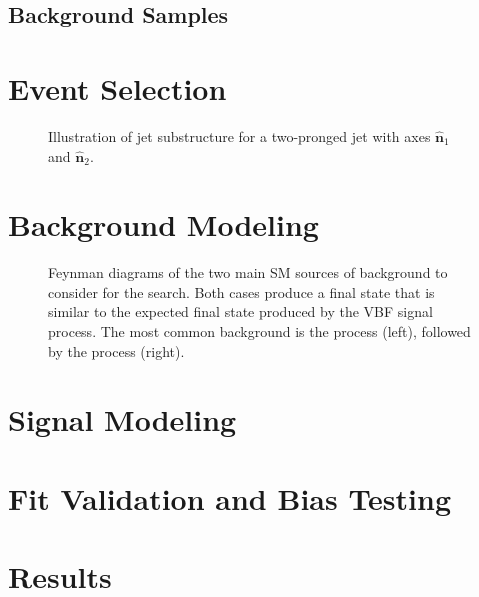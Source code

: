 \begin{table}[htbp]
  \centering
  
  \caption{
  }
  \label{tab:VBFZprToWWSamples}
\end{table}

\subsection{Background Samples}

\section{Event Selection}
\label{sec:events}

\begin{figure}[htbp]
  \centering
  
  \caption{Illustration of jet substructure for a two-pronged jet with axes $\mathbf{\hat{n}}_1$ and $\mathbf{\hat{n}}_2$.}
  \label{fig:jet}
\end{figure}

\section{Background Modeling}
\label{sec:bkg}

\begin{figure}[htbp]
  \centering
  
  \caption{Feynman diagrams of the two main SM sources of background to consider for the search. Both cases produce a final state that is similar to the expected final state produced by the VBF signal process. The most common background is the \Wjets process (left), followed by the \WVt process (right).}
  \label{fig:bkgFeynman}
\end{figure}

\section{Signal Modeling}
\label{sec:sig}

\section{Fit Validation and Bias Testing}
\label{sec:bias}

\section{Results}
\label{sec:results}
